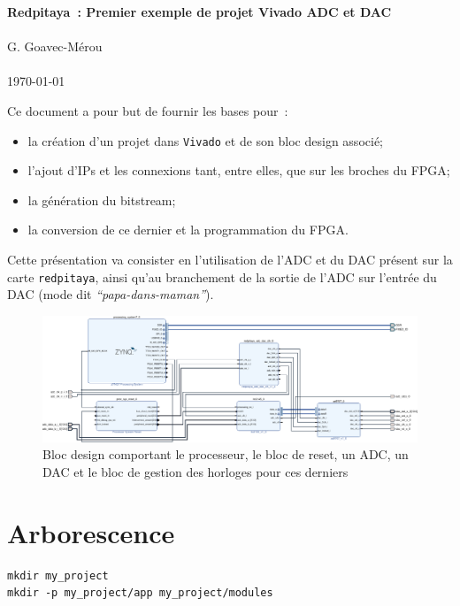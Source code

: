 \documentclass[12pt,oneside]{article}
\begin{document}
\begin{center}
{\bf \Large Redpitaya~: Premier exemple de projet Vivado ADC et DAC} \\ \ \\
G. Goavec-M\'erou \\ \ \\ \today
\end{center}

Ce document a pour but de fournir les bases pour~:
\begin{itemize}
\item la cr\'eation d'un projet dans {\tt Vivado} et de son bloc design associ\'e;
\item l'ajout d'IPs et les connexions tant, entre elles, que sur les broches du
FPGA;
\item la g\'en\'eration du bitstream;
\item la conversion de ce dernier et la programmation du FPGA.
\end{itemize}

Cette pr\'esentation va consister en l'utilisation de l'ADC et du DAC
pr\'esent sur la carte {\tt redpitaya}, ainsi qu'au branchement de la sortie de
l'ADC sur l'entr\'ee du DAC (mode dit \textit{``papa-dans-maman''}).

\begin{figure}[h!tb]
\includegraphics{./block_design.pdf}
\caption{Bloc design comportant le processeur, le bloc de reset, un ADC, un DAC
et le bloc de gestion des horloges pour ces derniers}
\label{bloc_design_final}
\end{figure}


\section{Arborescence}

\begin{lstlisting}
mkdir my_project
mkdir -p my_project/app my_project/modules
\end{lstlisting}

\end{document}
